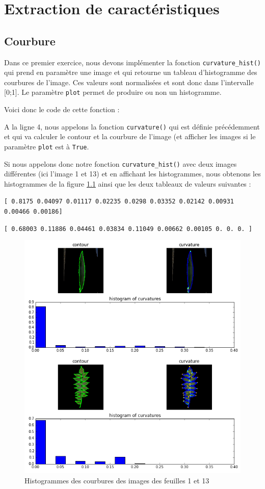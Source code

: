 \chapter{Extraction de caractéristiques}
\section{Courbure}

Dans ce premier exercice, nous devons implémenter la fonction \texttt{curvature\_hist()} qui prend en paramètre une image et qui retourne un tableau d'histogramme des courbures de l'image. Ces valeurs sont normalisées et sont donc dans l'intervalle [0;1]. Le paramètre \texttt{plot} permet de produire ou non un histogramme.

Voici donc le code de cette fonction :



A la ligne 4, nous appelons la fonction \texttt{curvature()} qui est définie précédemment et qui va calculer le contour et la courbure de l'image (et afficher les images si le paramètre \texttt{plot} est à \texttt{True}.


Si nous appelons donc notre fonction \texttt{curvature\_hist()} avec deux images différentes (ici l'image 1 et 13) et en affichant les histogrammes, nous obtenons les histogrammes de la figure \ref{curvaturehist} ainsi que les deux tableaux de valeurs suivantes :

\vspace{0.6cm}
\small\texttt{[ 0.8175   0.04097  0.01117  0.02235  0.0298   0.03352  0.02142  0.00931  0.00466  0.00186]}

\small\texttt{[ 0.68003  0.11886  0.04461  0.03834  0.11049  0.00662  0.00105  0.       0.       0.     ]}
\vspace{0.6cm}

\begin{figure}[h]
  \centering
    \includegraphics[width=0.6\linewidth]{img/curvatureHist.png}
  \caption{Histogrammes des courbures des images des feuilles 1 et 13}
  \label{curvaturehist}
\end{figure}


